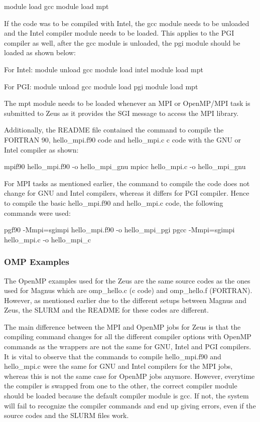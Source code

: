 \documentclass[journal]{IEEEtran}
\begin{document}
module load gcc
module load mpt

If the code was to be compiled with Intel, the gcc module needs to be unloaded and the Intel compiler module needs to be loaded. This applies to the PGI
compiler as well, after the gcc module is unloaded, the pgi module should be loaded as shown below:

For Intel:
module unload gcc
module load intel
module load mpt

For PGI:
module unload gcc
module load pgi
module load mpt

The mpt module needs to be loaded whenever an MPI or OpenMP/MPI task is submitted to Zeus as it provides the SGI message to access the MPI library.

Additionally, the README file contained the command to compile the FORTRAN 90, hello_mpi.f90 code and hello_mpi.c c code with the GNU or Intel compiler 
as shown:

mpif90 hello_mpi.f90 -o hello_mpi_gnu
mpicc hello_mpi.c -o hello_mpi_gnu

For MPI tasks as mentioned earlier, the command to compile the code does not change for GNU and Intel compilers, whereas it differs for PGI compiler.
Hence to compile the basic hello_mpi.f90 and hello_mpi.c code, the following commands were used:

pgf90 -Mmpi=sgimpi hello_mpi.f90 -o hello_mpi_pgi
pgcc -Mmpi=sgimpi hello_mpi.c -o hello_mpi_c 
  

\subsubsection{OMP Examples}

The OpenMP examples used for the Zeus are the same source codes as the ones used for Magnus which are omp_hello.c (c code) and omp_hello.f (FORTRAN).
However, as mentioned earlier due to the different setups between Magnus and Zeus, the SLURM and the README for these codes are different.

The main difference between the MPI and OpenMP jobs for Zeus is that the compiling command changes for all the different compiler options with OpenMP
commands as the wrappers are not the same for GNU, Intel and PGI compilers. It is vital to observe that the commands to compile hello_mpi.f90 and
hello_mpi.c were the same for GNU and Intel compilers for the MPI jobs, whereas this is not the same case for OpenMP jobs anymore. However, everytime the
compiler is swapped from one to the other, the correct compiler module should be loaded because the default compiler module is gcc. If not, the system 
will fail to recognize the compiler commands and end up giving errors, even if the source codes and the SLURM files work.
\end{document}
